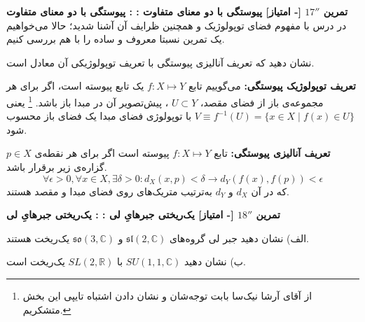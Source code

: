 \documentclass{article}
\newenvironment{parind}{%
	\par%
	\leftskip=0mm\rightskip=7mm
	\noindent\ignorespaces}{%
	\par}
\newenvironment{exercise}[3][\unskip]{%
	\par
	\noindent
	\textbf{تمرین
		#1
		[- امتیاز] 
		\def\temp{#3}\ifx\temp\empty
		: 
		\else
		: #3 \vspace{0.5em} \\ \noindent
		\fi
}}{}
\begin{document}
	\begin{exercise}[$17''$]{20}{پیوستگی با دو معنای متفاوت}
		\noindent
		در درس با مفهوم فضای توپولوژیک و همچنین ظرایف آن آشنا شدید؛ حالا می‌خواهیم یک تمرین نسبتا معروف و ساده را با هم بررسی کنیم.
		
		نشان دهید که تعریف آنالیزی پیوستگی با تعریف توپولوژیکی آن معادل است.
		\begin{mdframed}
			\textbf{تعریف توپولوژیک پیوستگی:}
			می‌گوییم تابع
			$f: X \mapsto Y$ 
			یک تابع پیوسته است، اگر برای هر مجموعه‌ی باز از فضای مقصد،
			$U \subset Y$
			،
			پیش‌تصویر
			آن در مبدا باز باشد.
			\footnote{از  آقای آرشا نیک‌سا بابت توجه‌شان و نشان دادن اشتباه تایپی این بخش متشکریم.}
			یعنی 
			$V \equiv f^{-1}(U) = \{
			x\in X \; | \; f(x) \in U
			\}$
			با توپولوژی فضای مبدا یک فضای باز محسوب شود.
			
			\textbf{تعریف آنالیزی پیوستگی:}
			تابع
			$f: X \mapsto Y$
			پیوسته است اگر برای هر نقطه‌ی 
			$p \in X$
			گزاره‌ی زیر برقرار باشد.
			\[
			\forall \epsilon>0, \forall x \in X, \exists \delta>0 : d_X(x,p)<\delta \xrightarrow{\quad} d_Y(f(x),f(p))<\epsilon
			\]
			که در آن 
			$d_X$
			و
			$d_Y$
			به‌ترتیب متریک‌های روی فضای مبدا و مقصد هستند.
			
		\end{mdframed}
		
	\end{exercise}
	
	
	\begin{exercise}[$18''$]{20}{یک‌ریختی جبر‌هایِ لی}
		\vspace{-1em}
		\begin{parind}
			الف)	نشان دهید جبر لی گروه‌های 
			$\mathfrak{sl}(2,\mathbb{C})$ 
			و 
			$\mathfrak{so}(3,\mathbb{C})$ 
			یک‌ریخت هستند. 
			
			
			ب)	نشان دهید 
			$SU(1,1,\mathbb{C}) $ 
			با 
			$SL(2,\mathbb{R}) $ 
			یک‌ریخت است.
		\end{parind}
		
		
	\end{exercise}
	
\end{document}
